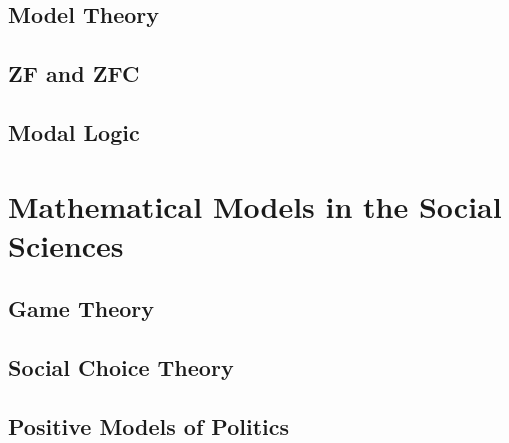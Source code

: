\documentclass[oneside,openany]{book}
\theoremstyle{definition}
\begin{document}
\chapter{Model Theory}


\chapter{ZF and ZFC}


\chapter{Modal Logic}



\part{Mathematical Models in the Social Sciences}

\chapter{Game Theory}


\chapter{Social Choice Theory}


\chapter{Positive Models of Politics}



\printindex
\end{document}
